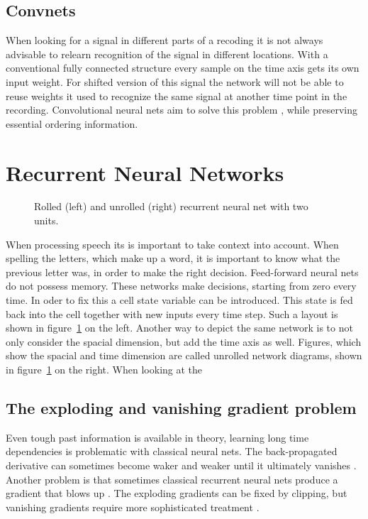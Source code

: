 \subsection{Convnets}
When looking for a signal in different parts of a recoding it is not always advisable to relearn recognition
of the signal in different locations. With a conventional fully connected structure every sample on the time axis gets its own input weight. For shifted version of this signal the network will not be able to reuse weights it used
to recognize the same signal at another time point in the recording.
Convolutional neural nets aim to solve this problem \cite[page 6]{Dumoulin2016}, while preserving essential ordering information.

\section{Recurrent Neural Networks}
\begin{figure}
\centering

\caption{Rolled (left) and unrolled (right) recurrent neural net with two units.}
\label{fig:unrolledNet}
\end{figure}
When processing speech its is important to take context into account. When spelling the letters, which make up a word, it is important to know what the previous letter was, in order to make the right decision. 
Feed-forward neural nets do not possess memory. These networks make decisions, starting from zero every time. In oder to fix this a cell state variable can be introduced. This state is fed back into the cell together with new inputs every time step. Such a layout is shown in figure~\ref{fig:unrolledNet} on the left. 
Another way to depict the same network is to not only consider the spacial dimension, but add the time axis as well. Figures, which show the spacial and time dimension are called unrolled network diagrams, shown in figure~\ref{fig:unrolledNet} on the right. When looking at the 



\subsection{The exploding and vanishing gradient problem}
Even tough past information is available in theory, learning long time dependencies is problematic with classical neural nets. The back-propagated derivative can sometimes become waker and weaker until it ultimately vanishes \cite{Hochreiter1998}. Another problem is that sometimes classical recurrent neural nets produce a gradient that blows up \cite{Pascanu2012}. The exploding gradients can be fixed by clipping, but vanishing gradients require more sophisticated treatment \cite{Bengio1993}.     

